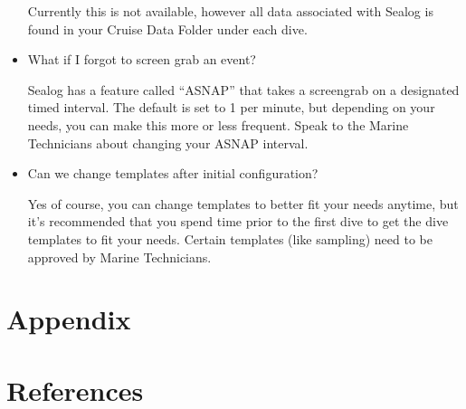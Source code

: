 \documentclass[
  letterpaper,
  DIV=11,
  numbers=noendperiod]{scrreprt}
\newlength{\cslhangindent}
\newlength{\cslentryspacingunit} %
\newenvironment{CSLReferences}[2] %
 {%
  \setlength{\parindent}{0pt}
  \ifodd #1
  \let\oldpar\par
  \def\par{\hangindent=\cslhangindent\oldpar}
  \fi
  \setlength{\parskip}{#2\cslentryspacingunit}
 }%
 {}
\begin{document}
\begin{itemize}
  Currently this is not available, however all data associated with
  Sealog is found in your Cruise Data Folder under each dive.
\item
  What if I forgot to screen grab an event?

  Sealog has a feature called ``ASNAP'' that takes a screengrab on a
  designated timed interval. The default is set to 1 per minute, but
  depending on your needs, you can make this more or less frequent.
  Speak to the Marine Technicians about changing your ASNAP interval.
\item
  Can we change templates after initial configuration?

  Yes of course, you can change templates to better fit your needs
  anytime, but it's recommended that you spend time prior to the first
  dive to get the dive templates to fit your needs. Certain templates
  (like sampling) need to be approved by Marine Technicians.
\end{itemize}


\hypertarget{appendix}{%
\chapter{Appendix}\label{appendix}}


\hypertarget{references}{%
\chapter*{References}\label{references}}


\hypertarget{refs}{}
\begin{CSLReferences}{0}{0}
\end{CSLReferences}
\end{document}
